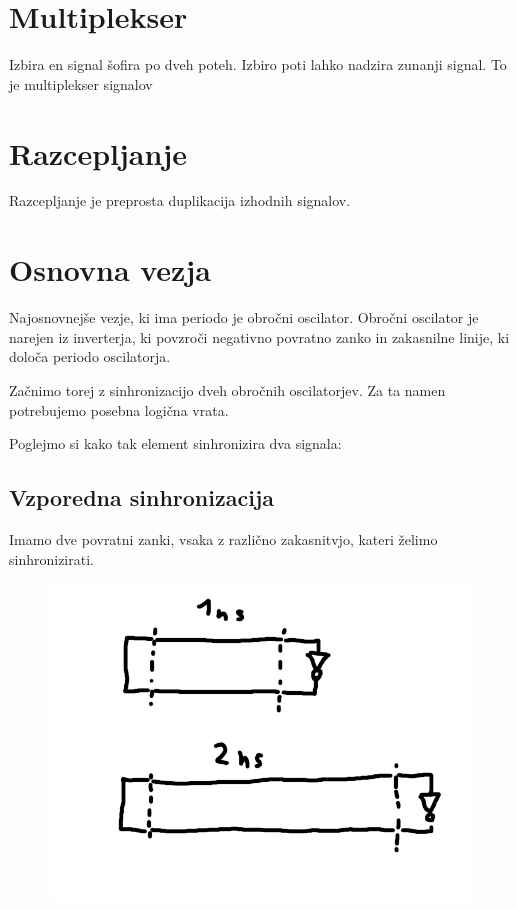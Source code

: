 \section{Multiplekser} \label{a}
Izbira en signal šofira po dveh poteh. Izbiro poti lahko nadzira zunanji signal. To je multiplekser signalov

\section{Razcepljanje} \label{a}
Razcepljanje je preprosta duplikacija izhodnih signalov.


\section{Osnovna vezja} \label{b}
Najosnovnejše vezje, ki ima periodo je obročni oscilator. Obročni oscilator je narejen iz inverterja, ki povzroči negativno povratno zanko in zakasnilne linije, ki določa periodo oscilatorja.

Začnimo torej z sinhronizacijo dveh obročnih oscilatorjev. Za ta namen potrebujemo posebna logična vrata.

Poglejmo si kako tak element sinhronizira dva signala:

\subsection{Vzporedna sinhronizacija} \label{c}

Imamo dve povratni zanki, vsaka z različno zakasnitvjo, kateri želimo sinhronizirati.

\begin{figure}[H]
	\centering
	\includegraphics[width=0.7\linewidth]{slike/osnove/dly1}
	\caption{}
	\label{fig:celement}
\end{figure}

